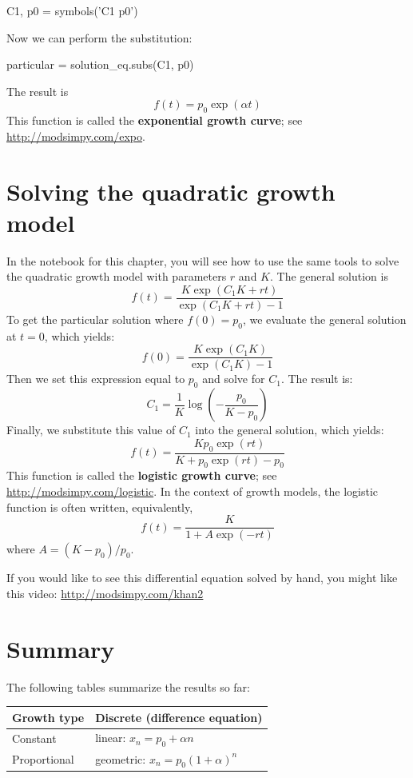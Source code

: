 \documentclass[12pt]{book}
\theoremstyle{exercise}
\begin{document}
\begin{python}
C1, p0 = symbols('C1 p0')
\end{python}

Now we can perform the substitution:

\begin{python}
particular = solution_eq.subs(C1, p0)
\end{python}

The result is 
%
\[ f{\left (t \right )} = p_{0} \exp(\alpha t) \]
%
This function is called the {\bf exponential growth curve}; see \url{http://modsimpy.com/expo}.

\section{Solving the quadratic growth model}

In the notebook for this chapter, you will see how to use the same tools to solve the quadratic growth model with parameters $r$ and $K$.  The general solution is
%
\[ f{\left (t \right )} = \frac{K \exp(C_{1} K + r t)}{\exp(C_{1} K + r t) - 1} \]
%
To get the particular solution where $f(0) = p_0$, we evaluate the general solution at $t=0$, which yields:
%
\[ f(0) = \frac{K \exp(C_{1} K)}{\exp(C_{1} K) - 1} \]
%
Then we set this expression equal to $p_0$ and solve for $C_1$.  The result is:
%
\[ C_1 = \frac{1}{K} \log{\left (- \frac{p_{0}}{K - p_{0}} \right )} \]
%
Finally, we substitute this value of $C_1$ into the general solution, which yields:
%
\[ f(t) = \frac{K p_{0} \exp(r t)}{K + p_{0} \exp(r t) - p_{0}} \]
%
This function is called the {\bf logistic growth curve}; see \url{http://modsimpy.com/logistic}.  In the context of growth models, the logistic function is often written, equivalently,
%
\[ f(t) = \frac{K}{1 + A \exp(-rt)} \]
%
where $A = (K - p_0) / p_0$.

If you would like to see this differential equation solved by hand, you might like this video: \url{http://modsimpy.com/khan2}

\section{Summary}

The following tables summarize the results so far:

\begin{tabular}{l|l} 
\hline
Growth type         & Discrete (difference equation) \\ 
\hline 
Constant & linear: $x_n = p_0 + \alpha n$  \\ 
 
Proportional & geometric: $x_n = p_0(1+\alpha)^n$  \\ 

\end{tabular} 
\end{document}
